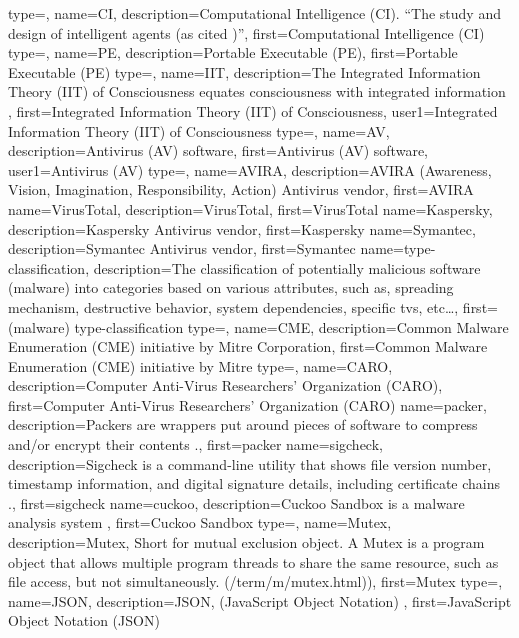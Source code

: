 {
  type=\acronymtype,
  name=CI,
  description={Computational Intelligence (CI). ``The study and design of intelligent agents \citep{poole1998computational} (as cited \citep{russell2009artificial})''},
  first={Computational Intelligence (CI)}
}
{
  type=\acronymtype,
  name=PE,
  description={Portable Executable (PE)},
  first={Portable Executable (PE)}
}
{
  type=\acronymtype,
  name=IIT,
  description={The Integrated Information Theory (IIT) of Consciousness equates consciousness with integrated information \citep{tononi2012integrated}},
  first={Integrated Information Theory (IIT) of Consciousness},
  user1={Integrated Information Theory (IIT) of Consciousness}
}
{
  type=\acronymtype,
  name=AV,
  description={Antivirus (AV) software},
  first={Antivirus (AV) software},
  user1={Antivirus (AV)}
}
{
  type=\acronymtype,
  name=AVIRA,
  description={AVIRA (Awareness, Vision, Imagination, Responsibility, Action) Antivirus vendor},
  first={AVIRA}
}
{
  name=VirusTotal,
  description={VirusTotal},
  first={VirusTotal}
}
{
  name=Kaspersky,
  description={Kaspersky Antivirus vendor},
  first={Kaspersky}
}
{
  name=Symantec,
  description={Symantec Antivirus vendor},
  first={Symantec}
}
{
  name=type-classification,
  description={The classification of potentially malicious software (malware) into categories based on various attributes, such as, spreading mechanism, destructive behavior, system dependencies, specific \glspl{tv}, etc\dots \citep{szor2005art}},
  first={(malware) type-classification}
}
{
  type=\acronymtype,
  name=CME,
  description={Common Malware Enumeration (CME) initiative by Mitre Corporation},
  first={Common Malware Enumeration (CME) initiative by Mitre}
}
{
  type=\acronymtype,
  name=CARO,
  description={Computer \-Anti-Virus \-Researchers' \-Organization (CARO)},
  first={Computer \-Anti-Virus \-Researchers' \-Organization (CARO)}
}
{
  name=packer,
  description={Packers are wrappers put around pieces of software to compress and/or encrypt their contents \citep{virusbtnpacker}.},
  first={packer}
}
{
  name=sigcheck,
  description={Sigcheck is a command-line utility that shows file version number, timestamp information, and digital signature details, including certificate chains \citep{SigCheck}.},
  first={sigcheck}
}
{
  name=cuckoo,
  description={Cuckoo Sandbox is a malware analysis system \citep{cuckooSandBox}},
  first={Cuckoo Sandbox}
}
{
  type=\acronymtype,
  name=Mutex,
  description={Mutex, Short for mutual exclusion object. A Mutex is a program object that allows multiple program threads to share the same resource, such as file access, but not simultaneously. \citep{webopedia} (/term/m/mutex.html))},
  first={Mutex}
}
{
  type=\acronymtype,
  name=JSON,
  description={JSON, (JavaScript Object Notation) },
  first={JavaScript Object Notation (JSON)}
}

